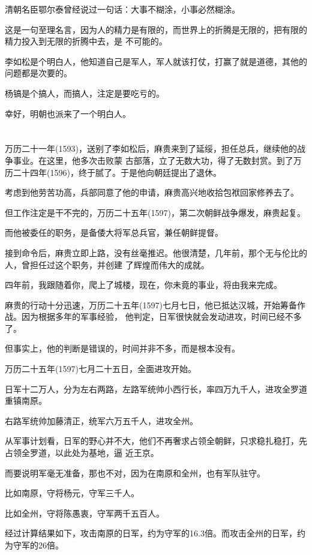 \documentclass[11pt,a4paper,onecolumn]{article}
\begin{document}
清朝名臣鄂尔泰曾经说过一句话：大事不糊涂，小事必然糊涂。

这是一句至理名言，因为人的精力是有限的，而世界上的折腾是无限的，把有限的精力投入到无限的折腾中去，是
不可能的。

李如松是个明白人，他知道自己是军人，军人就该打仗，打赢了就是道德，其他的问题都是次要的。

杨镐是个搞人，而搞人，注定是要吃亏的。

幸好，明朝也派来了一个明白人。

\section[\thesection]{}

万历二十一年(1593)，送别了李如松后，麻贵来到了延绥，担任总兵，继续他的战争事业。在这里，他多次击败蒙
古部落，立了无数大功，得了无数封赏。到了万历二十四年(1596)，终于腻了。于是他向朝廷提出了退休。

考虑到他劳苦功高，兵部同意了他的申请，麻贵高兴地收拾包袱回家修养去了。

但工作注定是干不完的，万历二十五年(1597)，第二次朝鲜战争爆发，麻贵起复。

而他被委任的职务，是备倭大将军总兵官，兼任朝鲜提督。

接到命令后，麻贵立即上路，没有丝毫推迟。他很清楚，几年前，那个无与伦比的人，曾担任过这个职务，并创建
了辉煌而伟大的成就。

四年前，我跟随着你，爬上了城楼，现在，你未竟的事业，将由我来完成。

麻贵的行动十分迅速，万历二十五年(1597)七月七日，他已抵达汉城，开始筹备作战。因为根据多年的军事经验，
他判定，日军很快就会发动进攻，时间已经不多了。

但事实上，他的判断是错误的，时间并非不多，而是根本没有。

万历二十五年(1597)七月二十五日，全面进攻开始。

日军十二万人，分为左右两路，左路军统帅小西行长，率四万九千人，进攻全罗道重镇南原。

右路军统帅加藤清正，统军六万五千人，进攻全州。

从军事计划看，日军的野心并不大，他们不再奢求占领全朝鲜，只求稳扎稳打，先占领全罗道，以此处为基地，逼
近王京。

而要说明军毫无准备，那也不对，因为在南原和全州，也有军队驻守。

比如南原，守将杨元，守军三千人。

比如全州，守将陈愚衷，守军两千五百人。

经过计算结果如下，攻击南原的日军，约为守军的16.3倍。而攻击全州的日军，约为守军的26倍。
\end{document}
